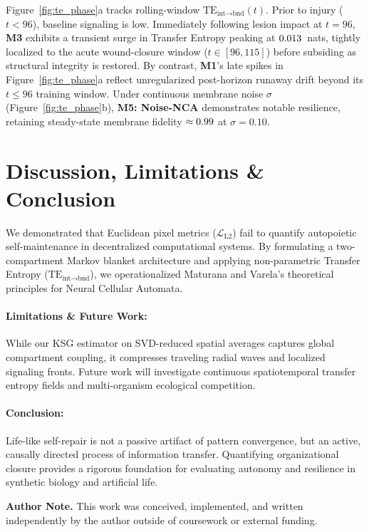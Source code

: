 \documentclass[10pt,twocolumn]{article}
\begin{document}
Figure~\ref{fig:te_phase}a tracks rolling-window $\text{TE}_{\text{int}\to\text{bnd}}(t)$. Prior to injury ($t < 96$), baseline signaling is low. Immediately following lesion impact at $t=96$, \textbf{M3} exhibits a transient surge in Transfer Entropy peaking at $0.013$~nats, tightly localized to the acute wound-closure window ($t \in [96, 115]$) before subsiding as structural integrity is restored. By contrast, \textbf{M1}'s late spikes in Figure~\ref{fig:te_phase}a reflect unregularized post-horizon runaway drift beyond its $t \le 96$ training window. Under continuous membrane noise $\sigma$ (Figure~\ref{fig:te_phase}b), \textbf{M5: Noise-NCA} demonstrates notable resilience, retaining steady-state membrane fidelity $\approx 0.99$ at $\sigma = 0.10$.

\section{Discussion, Limitations \& Conclusion}

We demonstrated that Euclidean pixel metrics ($\mathcal{L}_{\text{L2}}$) fail to quantify autopoietic self-maintenance in decentralized computational systems. By formulating a two-compartment Markov blanket architecture and applying non-parametric Transfer Entropy ($\text{TE}_{\text{int}\to\text{bnd}}$), we operationalized Maturana and Varela's theoretical principles for Neural Cellular Automata. 

\paragraph{Limitations \& Future Work:} While our KSG estimator on SVD-reduced spatial averages captures global compartment coupling, it compresses traveling radial waves and localized signaling fronts. Future work will investigate continuous spatiotemporal transfer entropy fields and multi-organism ecological competition.

\paragraph{Conclusion:} Life-like self-repair is not a passive artifact of pattern convergence, but an active, causally directed process of information transfer. Quantifying organizational closure provides a rigorous foundation for evaluating autonomy and resilience in synthetic biology and artificial life.

\noindent\textbf{Author Note.} This work was conceived, implemented, and written independently by the author outside of coursework or external funding.

\vspace{-4pt}
\begingroup
\small
\setlength{\bibsep}{0pt}


\endgroup
\end{document}
